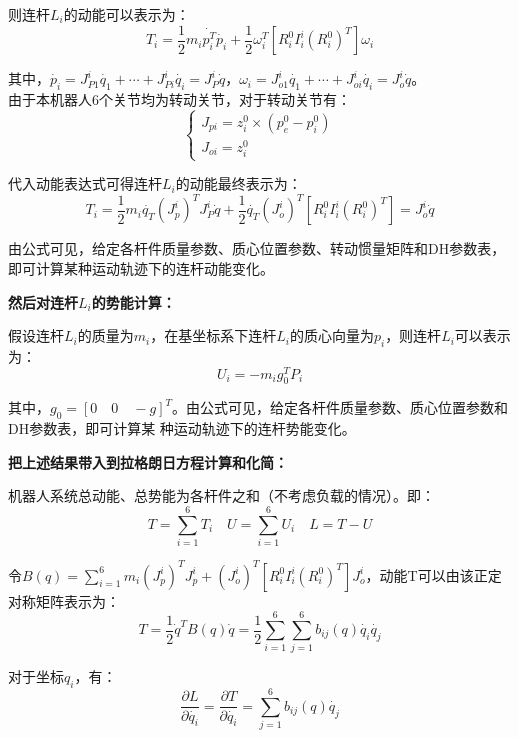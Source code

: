 \documentclass[12pt]{ctexart}
\begin{document}
则连杆$L_i$的动能可以表示为：
\begin{equation}
    T_i=\frac{1}{2}m_i\dot{p_i^T}\dot{p_i}+\frac{1}{2}\omega_i^T[R_i^0I_i^i(R_i^0)^T]\omega_i
\end{equation}

其中，$\dot{p_i}=J_{P1}^i\dot{q_1}+ \cdots +J_{Pi}^i\dot{q_i}=J_P^i\dot{q}$，$\omega_i=J_{o1}^i\dot{q_1}+\cdots +J_{oi}^i\dot{q_i}=J_o^i\dot{q}
$。\\

由于本机器人6个关节均为转动关节，对于转动关节有：
\begin{equation}
    \begin{cases}
        J_{pi}=z_i^0\times (p_e^0-p_i^0)\\
        J_{oi}=z_i^0
    \end{cases}
\end{equation}

代入动能表达式可得连杆$L_i$的动能最终表示为： 
\begin{equation}
    T_i=\frac{1}{2}m_i\dot{q_T}(J_p^i)^TJ_P^i\dot{q}+\frac{1}{2}\dot{q_T}(J_o^i)^T[R_i^0I_i^i(R_i^0)^T]=J_o^i\dot{q}
\end{equation}

由公式可见，给定各杆件质量参数、质心位置参数、转动惯量矩阵和DH参数表，即可计算某种运动轨迹下的连杆动能变化。

\textbf{然后对连杆\(L_i\)的势能计算：}

假设连杆$L_i$的质量为$m_i$，在基坐标系下连杆$L_i$的质心向量为$p_i$，则连杆$L_i$可以表示为：
\begin{equation}
    U_i=-m_ig_0^TP_i
\end{equation}

其中，$g_0=[0\quad 0\quad -g]^T$。由公式可见，给定各杆件质量参数、质心位置参数和DH参数表，即可计算某
种运动轨迹下的连杆势能变化。

\textbf{把上述结果带入到拉格朗日方程计算和化简：}

机器人系统总动能、总势能为各杆件之和（不考虑负载的情况）。即：
\[
T=\sum_{i=1}^{6}T_i\quad U=\sum_{i=1}^{6}U_i\quad L=T-U
\]

令$B(q)=\sum_{i=1}^{6}m_i(J_p^i)^T J_p^i+(J_o^i)^T[R_i^0I_i^i(R_i^0)^T]J_o^i$，动能T可以由该正定对称矩阵表示为：
\begin{equation}
    T=\frac{1}{2}\dot{q}^TB(q)\dot{q}=\frac{1}{2}\sum_{i=1}^6\sum_{j=1}^6b_{ij}(q)\dot{q_i}\dot{q_j}
\end{equation}

对于坐标$q_i$，有：
\begin{equation}
    \frac{\partial L}{\partial \dot{q_i}}=\frac{\partial T}{\partial \dot{q_i}}=\sum_{j=1}^6b_{ij}(q)\dot{q_j}
\end{equation}
\end{document}
